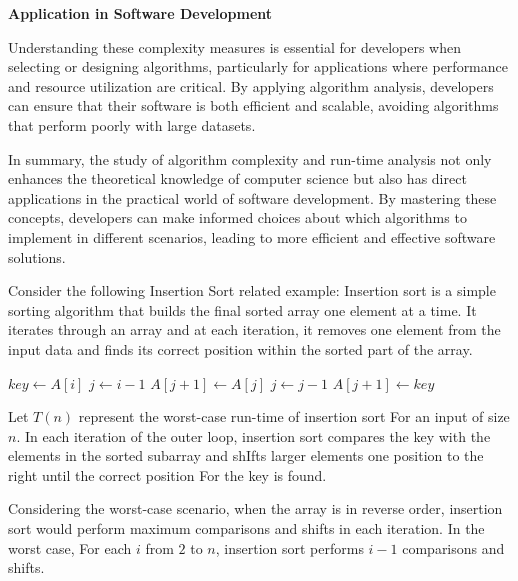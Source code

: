 \documentclass[12pt]{book} %
\begin{document}
\textbf{Application in Software Development}

Understanding these complexity measures is essential for developers when selecting or designing algorithms, particularly for applications where performance and resource utilization are critical. By applying algorithm analysis, developers can ensure that their software is both efficient and scalable, avoiding algorithms that perform poorly with large datasets.

In summary, the study of algorithm complexity and run-time analysis not only enhances the theoretical knowledge of computer science but also has direct applications in the practical world of software development. By mastering these concepts, developers can make informed choices about which algorithms to implement in different scenarios, leading to more efficient and effective software solutions.


Consider the following Insertion Sort related example:\newline
Insertion sort is a simple sorting algorithm that builds the final sorted array one element at a time. It iterates through an array and at each iteration, it removes one element from the input data and finds its correct position within the sorted part of the array.

\begin{algorithm}
\caption{Insertion Sort}
\begin{algorithmic}[1]
        \State $key \gets A[i]$
        \State $j \gets i - 1$
            \State $A[j + 1] \gets A[j]$
            \State $j \gets j - 1$
        \EndWhile
        \State $A[j + 1] \gets key$
    \EndFor
\EndProcedure
\end{algorithmic}
\end{algorithm}

Let $T(n)$ represent the worst-case run-time of insertion sort For an input of size $n$. In each iteration of the outer loop, insertion sort compares the key with the elements in the sorted subarray and shIfts larger elements one position to the right until the correct position For the key is found. 

Considering the worst-case scenario, when the array is in reverse order, insertion sort would perform maximum comparisons and shifts in each iteration. In the worst case, For each $i$ from $2$ to $n$, insertion sort performs $i-1$ comparisons and shifts.
\end{document}

